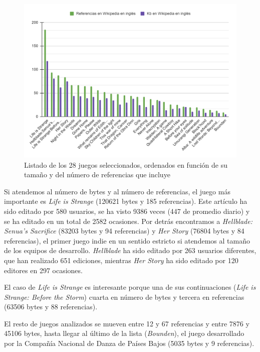 \documentclass[spanish]{textolivre}
\begin{document}
\begin{figure}[htbp]
\centering
\begin{minipage}{.85\textwidth}
 \includegraphics[width=\textwidth]{fig03.png}
 \caption{Listado de los 28 juegos seleccionados, ordenados en función de su tamaño y del número de referencias que incluye}
 \label{fig03}
\end{minipage}
\end{figure}

Si atendemos al número de bytes y al número de referencias, el juego más importante es \emph{Life is Strange} (120621 bytes y 185 referencias). Este artículo ha sido editado por 580 usuarios, se ha visto 9386 veces (447 de promedio diario) y se ha editado en un total de 2582 ocasiones. Por detrás encontramos a \emph{Hellblade: Senua's Sacrifice} (83203 bytes y 94 referencias) y \emph{Her Story} (76804 bytes y 84 referencias), el primer juego indie en un sentido estricto si atendemos al tamaño de los equipos de desarrollo. \emph{Hellblade} ha sido editado por 263 usuarios diferentes, que han realizado 651 ediciones, mientras \emph{Her Story} ha sido editado por 120 editores en 297 ocasiones.

El caso de \emph{Life is Strange} es interesante porque una de sus continuaciones (\emph{Life is Strange: Before the Storm}) cuarta en número de bytes y tercera en referencias (63506 bytes y 88 referencias).

El resto de juegos analizados se mueven entre 12 y 67 referencias y entre 7876 y 45106 bytes, hasta llegar al último de la lista (\textit{Bounden}), el juego desarrollado por la Compañía Nacional de Danza de Países Bajos (5035 bytes y 9 referencias). 
\end{document}
